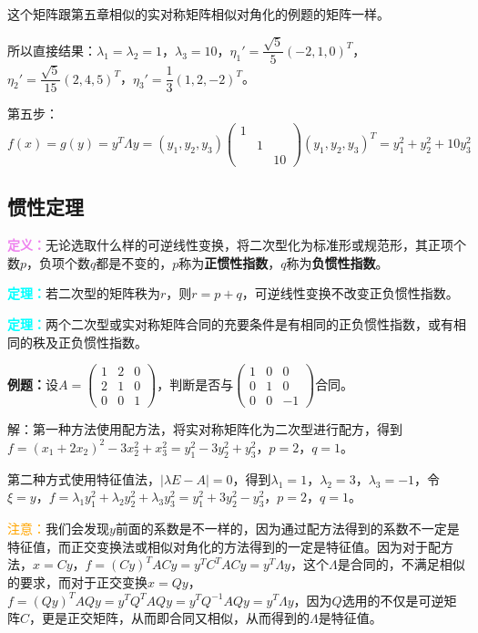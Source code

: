 \documentclass[UTF8, 12pt]{ctexart}
\begin{document}
这个矩阵跟第五章相似的实对称矩阵相似对角化的例题的矩阵一样。

所以直接结果：$\lambda_1=\lambda_2=1$，$\lambda_3=10$，$\eta_1'=\dfrac{\sqrt{5}}{5}(-2,1,0)^T$，$\eta_2'=\dfrac{\sqrt{5}}{15}(2,4,5)^T$，$\eta_3'=\dfrac{1}{3}(1,2,-2)^T$。

第五步：$f(x)=g(y)=y^T\Lambda y=(y_1,y_2,y_3)\left(\begin{array}{ccc}
    1 \\
     & 1 \\
     & & 10
\end{array}\right)(y_1,y_2,y_3)^T=y_1^2+y_2^2+10y_3^2$

\subsection{惯性定理}

\textcolor{violet}{\textbf{定义：}}无论选取什么样的可逆线性变换，将二次型化为标准形或规范形，其正项个数$p$，负项个数$q$都是不变的，$p$称为\textbf{正惯性指数}，$q$称为\textbf{负惯性指数}。

\textcolor{aqua}{\textbf{定理：}}若二次型的矩阵秩为$r$，则$r=p+q$，可逆线性变换不改变正负惯性指数。

\textcolor{aqua}{\textbf{定理：}}两个二次型或实对称矩阵合同的充要条件是有相同的正负惯性指数，或有相同的秩及正负惯性指数。

\textbf{例题：}设$A=\left(\begin{array}{ccc}
    1 & 2 & 0 \\
    2 & 1 & 0 \\
    0 & 0 & 1
\end{array}\right)$，判断是否与$\left(\begin{array}{ccc}
    1 & 0 & 0 \\
    0 & 1 & 0 \\
    0 & 0 & -1
\end{array}\right)$合同。

解：第一种方法使用配方法，将实对称矩阵化为二次型进行配方，得到$f=(x_1+2x_2)^2-3x_2^2+x_3^2=y_1^2-3y_2^2+y_3^2$，$p=2$，$q=1$。

第二种方式使用特征值法，$\vert\lambda E-A\vert=0$，得到$\lambda_1=1$，$\lambda_2=3$，$\lambda_3=-1$，令$\xi=y$，$f=\lambda_1y_1^2+\lambda_2y_2^2+\lambda_3y_3^2=y_1^2+3y_2^2-y_3^2$，$p=2$，$q=1$。

\textcolor{orange}{注意：}我们会发现$y$前面的系数是不一样的，因为通过配方法得到的系数不一定是特征值，而正交变换法或相似对角化的方法得到的一定是特征值。因为对于配方法，$x=Cy$，$f=(Cy)^TACy=y^TC^TACy=y^T\Lambda y$，这个$\Lambda$是合同的，不满足相似的要求，而对于正交变换$x=Qy$，$f=(Qy)^TAQy=y^TQ^TAQy=y^TQ^{-1}AQy=y^T\Lambda y$，因为$Q$选用的不仅是可逆矩阵$C$，更是正交矩阵，从而即合同又相似，从而得到的$\Lambda$是特征值。
\end{document}
